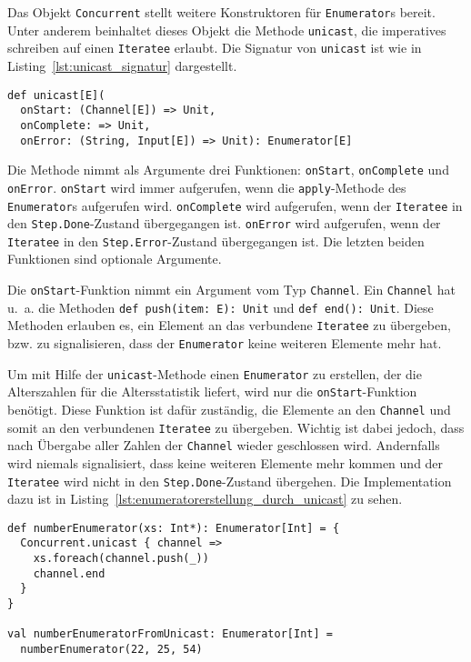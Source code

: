 Das Objekt \lstinline|Concurrent| stellt weitere Konstruktoren für \lstinline|Enumerator|s bereit.
Unter anderem beinhaltet dieses Objekt die Methode \lstinline|unicast|, die imperatives schreiben auf einen \lstinline|Iteratee| erlaubt.
Die Signatur von \lstinline|unicast| ist wie in Listing~\ref{lst:unicast_signatur} dargestellt.

\begin{lstlisting}[caption=Die Signatur von Concurrent.unicast, label=lst:unicast_signatur]
def unicast[E](
  onStart: (Channel[E]) => Unit,
  onComplete: => Unit,
  onError: (String, Input[E]) => Unit): Enumerator[E]
\end{lstlisting}

Die Methode nimmt als Argumente drei Funktionen: \lstinline|onStart|, \lstinline|onComplete| und \lstinline|onError|.
\lstinline|onStart| wird immer aufgerufen, wenn die \lstinline|apply|-Methode des \lstinline|Enumerator|s aufgerufen wird.
\lstinline|onComplete| wird aufgerufen, wenn der \lstinline|Iteratee| in den \lstinline|Step.Done|-Zustand übergegangen ist.
\lstinline|onError| wird aufgerufen, wenn der \lstinline|Iteratee| in den \lstinline|Step.Error|-Zustand übergegangen ist.
Die letzten beiden Funktionen sind optionale Argumente.

Die \lstinline|onStart|-Funktion nimmt ein Argument vom Typ \lstinline|Channel|.
Ein \lstinline|Channel| hat u.~a. die Methoden \lstinline[breaklines=true]|def push(item: E): Unit| und \lstinline[breaklines=true]|def end(): Unit|.
Diese Methoden erlauben es, ein Element an das verbundene \lstinline|Iteratee| zu übergeben, bzw. zu signalisieren, dass der \lstinline|Enumerator| keine weiteren Elemente mehr hat.

Um mit Hilfe der \lstinline|unicast|-Methode einen \lstinline|Enumerator| zu erstellen, der die Alterszahlen für die Altersstatistik liefert, wird nur die \lstinline|onStart|-Funktion benötigt.
Diese Funktion ist dafür zuständig, die Elemente an den \lstinline|Channel| und somit an den verbundenen \lstinline|Iteratee| zu übergeben.
Wichtig ist dabei jedoch, dass nach Übergabe aller Zahlen der \lstinline|Channel| wieder geschlossen wird.
Andernfalls wird niemals signalisiert, dass keine weiteren Elemente mehr kommen und der \lstinline|Iteratee| wird nicht in den \lstinline|Step.Done|-Zustand übergehen.
Die Implementation dazu ist in Listing~\ref{lst:enumeratorerstellung_durch_unicast} zu sehen.

\begin{lstlisting}[caption=Erstellung eines Enumerators durch die unicast-Konstruktormethode, label=lst:enumeratorerstellung_durch_unicast]
def numberEnumerator(xs: Int*): Enumerator[Int] = {
  Concurrent.unicast { channel =>
    xs.foreach(channel.push(_))
    channel.end
  }
}

val numberEnumeratorFromUnicast: Enumerator[Int] =
  numberEnumerator(22, 25, 54)
\end{lstlisting}

